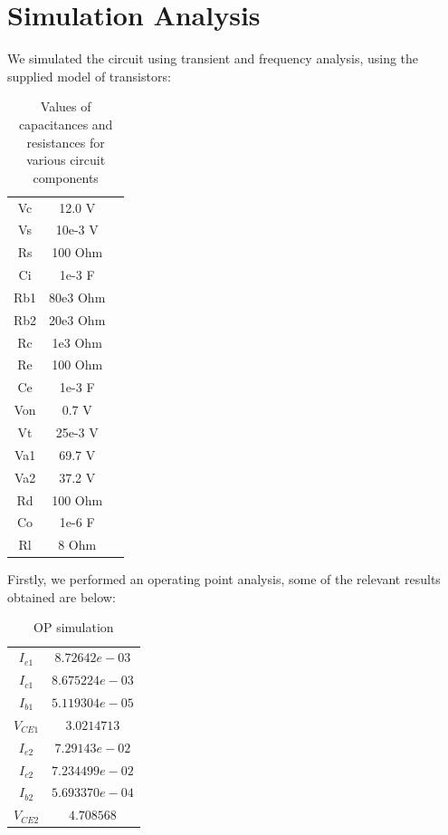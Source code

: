 \section{Simulation Analysis}
\label{sec:simulation}


We simulated the circuit using transient and frequency analysis, using the supplied model of transistors:

\begin{table}[H]
\addtolength{\tabcolsep}{-4pt}
\caption{Values of capacitances and resistances for various circuit components}
\vspace{-3mm}
\begin{tabular}{|c|c|c|}
\hline
Vc & 12.0 V\\
Vs & 10e-3 V\\
Rs & 100 Ohm\\
Ci & 1e-3 F\\
Rb1& 80e3 Ohm\\
Rb2 &20e3 Ohm\\
Rc & 1e3 Ohm\\
Re &100 Ohm\\
Ce & 1e-3 F\\
Von&0.7 V\\
Vt&25e-3 V\\
Va1&69.7 V\\
Va2&37.2 V\\
Rd & 100 Ohm\\
Co & 1e-6 F\\
Rl & 8 Ohm\\
\hline
\end{tabular}
\label{tab:Components}
\end{table}

\par

Firstly, we performed an operating point analysis, some of the relevant results obtained are below:

\begin{table}[H]
    \addtolength{\tabcolsep}{-4pt}
    \caption{OP simulation}
    \vspace{-3mm}
    \begin{tabular}{|c|c|}
    \hline
    $I_{e1}$ & $8.72642e-03$\\
    $I_{c1}$ & $8.675224e-03$\\
    $I_{b1}$ & $5.119304e-05$\\  
    $V_{CE1}$ & $3.0214713$\\
    $I_{e2}$ & $7.29143e-02$\\
    $I_{c2}$ & $7.234499e-02$\\
    $I_{b2}$ & $5.693370e-04$\\  
    $V_{CE2}$ & $4.708568$\\
    \hline
    \end{tabular}
    \label{tab:OP_sim}
\end{table}

